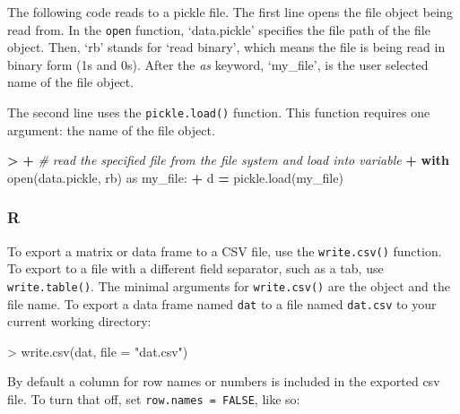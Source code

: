 \documentclass[
]{book}
\newenvironment{Shaded}{\begin{snugshade}}{\end{snugshade}}
\newcommand{\AttributeTok}[1]{\textcolor[rgb]{0.77,0.63,0.00}{#1}}
\newcommand{\BuiltInTok}[1]{#1}
\newcommand{\CommentTok}[1]{\textcolor[rgb]{0.56,0.35,0.01}{\textit{#1}}}
\newcommand{\ControlFlowTok}[1]{\textcolor[rgb]{0.13,0.29,0.53}{\textbf{#1}}}
\newcommand{\FunctionTok}[1]{\textcolor[rgb]{0.00,0.00,0.00}{#1}}
\newcommand{\ImportTok}[1]{#1}
\newcommand{\NormalTok}[1]{#1}
\newcommand{\OperatorTok}[1]{\textcolor[rgb]{0.81,0.36,0.00}{\textbf{#1}}}
\newcommand{\SpecialCharTok}[1]{\textcolor[rgb]{0.00,0.00,0.00}{#1}}
\newcommand{\StringTok}[1]{\textcolor[rgb]{0.31,0.60,0.02}{#1}}
\begin{document}
The following code reads to a pickle file. The first line opens the file object being read from. In the \texttt{open} function, `data.pickle' specifies the file path of the file object. Then, `rb' stands for `read binary', which means the file is being read in binary form (1s and 0s). After the \emph{as} keyword, `my\_file', is the user selected name of the file object.

The second line uses the \texttt{pickle.load()} function. This function requires one argument: the name of the file object.

\begin{Shaded}
\begin{Highlighting}[]
\OperatorTok{\textgreater{}} 
\OperatorTok{+} \CommentTok{\# read the specified file from the file system and load into variable}
\OperatorTok{+} \ControlFlowTok{with} \BuiltInTok{open}\NormalTok{(}\StringTok{\textquotesingle{}data.pickle\textquotesingle{}}\NormalTok{, }\StringTok{\textquotesingle{}rb\textquotesingle{}}\NormalTok{) }\ImportTok{as}\NormalTok{ my\_file:}
\OperatorTok{+}\NormalTok{     d }\OperatorTok{=}\NormalTok{ pickle.load(my\_file)}
\end{Highlighting}
\end{Shaded}

\hypertarget{r-16}{%
\subsubsection*{R}\label{r-16}}

To export a matrix or data frame to a CSV file, use the \texttt{write.csv()} function. To export to a file with a different field separator, such as a tab, use \texttt{write.table()}. The minimal arguments for \texttt{write.csv()} are the object and the file name. To export a data frame named \texttt{dat} to a file named \texttt{dat.csv} to your current working directory:

\begin{Shaded}
\begin{Highlighting}[]
\SpecialCharTok{\textgreater{}} \FunctionTok{write.csv}\NormalTok{(dat, }\AttributeTok{file =} \StringTok{"dat.csv"}\NormalTok{)}
\end{Highlighting}
\end{Shaded}

By default a column for row names or numbers is included in the exported csv file. To turn that off, set \texttt{row.names\ =\ FALSE}, like so:
\end{document}

